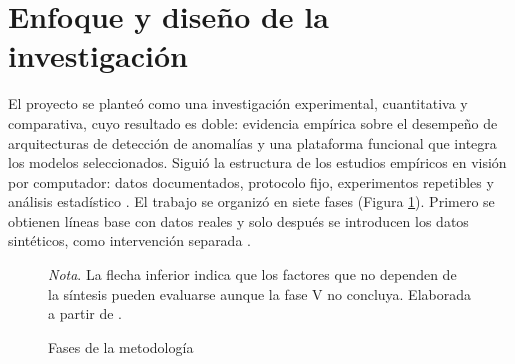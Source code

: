 \documentclass[12pt,oneside]{report}
\newcommand{\nota}[1]{\par\noindent\textit{Nota}. #1\par}
\begin{document}
\section{Enfoque y diseño de la investigación}

El proyecto se planteó como una investigación experimental, cuantitativa y comparativa, cuyo resultado es doble: evidencia empírica sobre el desempeño de arquitecturas de detección de anomalías y una plataforma funcional que integra los modelos seleccionados. Siguió la estructura de los estudios empíricos en visión por computador: datos documentados, protocolo fijo, experimentos repetibles y análisis estadístico \cite{pineau2021,bouthillier2021}. El trabajo se organizó en siete fases (Figura \ref{fig:fases}). Primero se obtienen líneas base con datos reales y solo después se introducen los datos sintéticos, como intervención separada \cite{paez2026}.

\begin{figure}[H]
\caption{Fases de la metodología}
\label{fig:fases}
\singlespacing
\centering
{}
\par\RaggedRight
\nota{La flecha inferior indica que los factores que no dependen de la síntesis pueden evaluarse aunque la fase V no concluya. Elaborada a partir de \cite{paez2026}.}
\end{figure}
\end{document}
